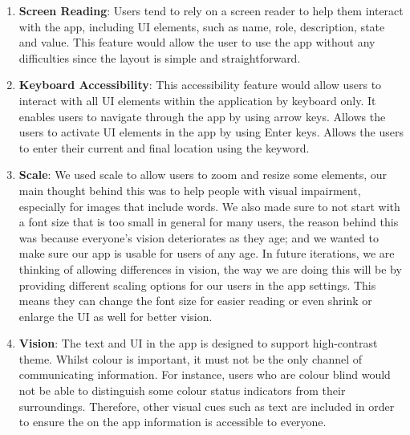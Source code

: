 \begin{enumerate}
	\item \textbf{Screen Reading}: Users tend to rely on a screen reader to help them interact with the app, including UI elements, such as name, role, description, state and value. This feature would allow the user to use the app without any difficulties since the layout is simple and straightforward. 

	\item \textbf{Keyboard Accessibility}: This accessibility feature would allow users to interact with all UI elements within the application by keyboard only. It enables users to navigate through the app by using arrow keys. Allows the users to activate UI elements in the app by using Enter keys. Allows the users to enter their current and final location using the keyword. 

	\item \textbf{Scale}:  We used scale to allow users to zoom and resize some elements, our main thought behind this was to help people with visual impairment, especially for images that include words. We also made sure to not start with a font size that is too small in general for many users, the reason behind this was because everyone’s vision deteriorates as they age; and we wanted to make sure our app is usable for users of any age. In future iterations, we are thinking of allowing differences in vision, the way we are doing this will be by providing different scaling options for our users in the app settings. This means they can change the font size for easier reading or even shrink or enlarge the UI as well for better vision. 

	\item \textbf{Vision}: The text and UI in the app is designed to support high-contrast theme. Whilst colour is important, it must not be the only channel of communicating information. For instance, users who are colour blind would not be able to distinguish some colour status indicators from their surroundings. Therefore, other visual cues such as text are included in order to ensure the on the app information is accessible to everyone. 
    
\end{enumerate}

